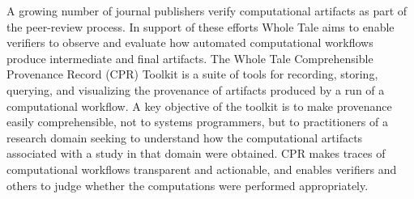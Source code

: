 A growing number of journal publishers verify computational artifacts as part of the peer-review process. In support of these efforts Whole Tale aims to enable verifiers to observe and evaluate how automated computational workflows produce intermediate and final artifacts. The Whole Tale Comprehensible Provenance Record (CPR) Toolkit is a suite of tools for recording, storing, querying, and visualizing the provenance of artifacts produced by a run of a computational workflow. A key objective of the toolkit is to make provenance easily comprehensible, not to systems programmers, but to practitioners of a research domain seeking to understand how the computational artifacts associated with a study in that domain were obtained. CPR makes traces of computational workflows transparent and actionable, and enables verifiers and others to judge whether the computations were performed appropriately.